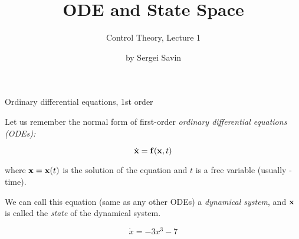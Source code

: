 \documentclass{beamer}
\title{ODE and State Space}
\subtitle{Control Theory, Lecture 1}
\author{by Sergei Savin}
\date{\mydate}
\begin{document}
\maketitle


%
%




\begin{frame}{Ordinary differential equations, 1st order}
\begin{flushleft}

Let us remember the normal form of first-order \emph{ordinary differential equations (ODEs):}

\begin{equation}
    \dot{\mathbf{x}} = \mathbf{f} (\mathbf{x}, t)
\end{equation}

where $\mathbf{x} = \mathbf{x}(t)$ is the solution of the equation and $t$ is a free variable (usually - time).

\bigskip

\begin{definition}
We can call this equation (same as any other ODEs) a \emph{dynamical system}, and $\mathbf{x}$ is called the \emph{state} of the dynamical system.  
\end{definition}

\begin{example}
\begin{equation}
    \dot{x} = -3 x^3 - 7 
\end{equation}
\end{example}

\end{flushleft}
\end{frame}
\end{document}
